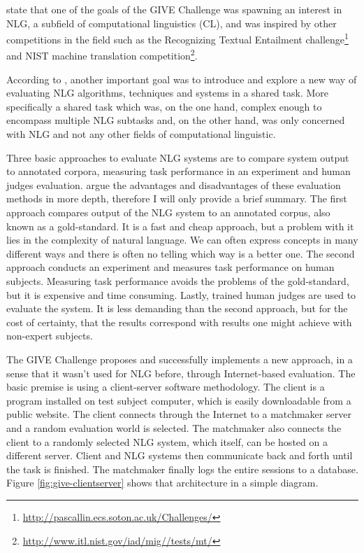 \citet{koller2010first} state that one of the goals of the GIVE Challenge was spawning an interest in NLG, a subfield of computational linguistics (CL), and was inspired by other competitions in the field such as the Recognizing Textual Entailment challenge\footnote{\url{http://pascallin.ecs.soton.ac.uk/Challenges/}} and NIST machine
translation competition\footnote{\url{http://www.itl.nist.gov/iad/mig//tests/mt/}}.

According to \citet{koller2010first}, another important goal was to introduce and explore a new way of evaluating NLG algorithms, techniques and systems in a shared task. More specifically a shared task which was, on the one hand, complex enough to encompass multiple NLG subtasks and, on the other hand, was only concerned with NLG and not any other fields of computational linguistic.

Three basic approaches to evaluate NLG systems are to compare system output to annotated corpora, measuring task performance in an experiment and human judges evaluation. \citet{koller2010first} argue the advantages and disadvantages of these evaluation methods in more depth, therefore I will only provide a brief summary. The first approach compares output of the NLG system to an annotated corpus, also known as a gold-standard. It is a fast and cheap approach, but a problem with it lies in the complexity of natural language. We can often express concepts in many different ways and there is often no telling which way is a better one. The second approach conducts an experiment and measures task performance on human subjects. Measuring task performance avoids the problems of the gold-standard, but it is expensive and time consuming. Lastly, trained human judges are used to evaluate the system. It is less demanding than the second approach, but for the cost of certainty, that the results correspond with results one might achieve with non-expert subjects.

The GIVE Challenge proposes and successfully implements a new approach, in a sense that it wasn't used for NLG before, through Internet-based evaluation. The basic premise is using a client-server software methodology. The client is a program installed on test subject computer, which is easily downloadable from a public website. The client connects through the Internet to a matchmaker server and a random evaluation world is selected. The matchmaker also connects the client to a randomly selected NLG system, which itself, can be hosted on a different server. Client and NLG systems then communicate back and forth until the task is finished. The matchmaker finally logs the entire sessions to a database. Figure \ref{fig:give-clientserver} shows that architecture in a simple diagram.

